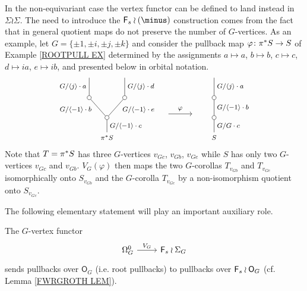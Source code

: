 \documentclass[a4paper,10pt]{article}%
\begin{document}
\begin{remark}\label{NEED_WREATH_REMARK}
	In the non-equivariant case the vertex functor can be defined to land instead in $\Sigma \wr \Sigma$.
	The need to introduce the $\Fin_s \wr (\minus)$ construction comes from the fact that
	in general quotient maps do not preserve the number of $G$-vertices.
	As an example,
	let $G=\{\pm 1, \pm i, \pm j, \pm k\}$ and consider the pullback map 
	$\varphi \colon \pi^{\**} S \to S$ of Example \ref{ROOTPULL EX}
	determined by the assignments
	$a \mapsto a$, $b \mapsto b$, $c \mapsto c$, $d \mapsto i a$, $e \mapsto i b$,	
	and presented below in orbital notation. 
		\[
		\begin{tikzpicture}[grow=up,auto,level distance=2.4em,every node/.style = {font=\footnotesize},dummy/.style={circle,draw,inner sep=0pt,minimum size=1.75mm}]
		\node at (0,0) {$\pi^{\**}S$}
			child{node [dummy] {}
				child{node [dummy] {}
					child{
					edge from parent node [swap] {$G/\langle j \rangle  \cdot d$}}
				edge from parent node[near end,swap] {$G/\langle -1 \rangle  \cdot e$}}
				child{node [dummy] {}
					child{
					edge from parent node {$G/\langle j \rangle  \cdot a$}}
				edge from parent node [near end] {$G/\langle -1 \rangle  \cdot b$}}		
			edge from parent node[swap] {$G/\langle -1 \rangle  \cdot c$}};
		\node at (4.53,0) {$S$}
			child{node [dummy] {}
				child{node [dummy] {}
					child{
					edge from parent node [swap] {$G/\langle j \rangle \cdot a$}}
				edge from parent node [swap] {$G / \langle -1 \rangle \cdot b$}}
			edge from parent node [swap] {$G/G \cdot c$}};
		\draw[->] (2.6,1) -- node [above] {$\varphi$} (3.6,1) ;
		\end{tikzpicture}
		\]
Note that $T = \pi^{\**} S$ has three $G$-vertices $v_{G c}$, $v_{G b}$, $v_{G e}$ while $S$ has only two $G$-vertices $v_{G c}$ and $v_{G b}$. $V_G(\varphi)$ then maps the two $G$-corollas 
$T_{v_{G b}}$ and $T_{v_{G e}}$
isomorphically onto $S_{v_{G b}}$
and the $G$-corolla $T_{v_{Gc}}$ by a non-isomorphism quotient onto $S_{v_{G c}}$.
\end{remark}


The following elementary statement will play an important auxiliary role.


\begin{lemma}\label{VGPULL LEM}
The $G$-vertex functor
\[
\begin{tikzcd}
	\Omega_{G}^0 \ar{r}{V_G} & \Fin_s \wr \Sigma_G
\end{tikzcd}
\]
sends pullbacks over $\mathsf{O}_G$ (i.e. root pullbacks)
to pullbacks over $\mathsf{F}_s \wr \mathsf{O}_G$
(cf. Lemma \ref{FWRGROTH LEM}).
\end{lemma}
\end{document}
